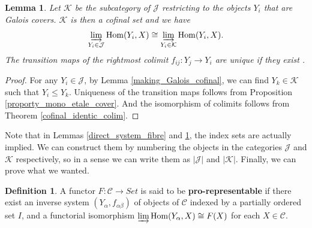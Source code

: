 \documentclass{article}
\theoremstyle{plain}
\newtheorem{lemma}[theorem]{Lemma}
\theoremstyle{definition}
\newtheorem{definition}[theorem]{Definition}
\DeclareMathOperator{\Hom}{Hom}
\begin{document}
\begin{lemma}
\label{inverse_system_Galois}
    Let $\mathcal{K}$ be the subcategory of $\mathcal{J}$ restricting to the objects $Y_i$ that are Galois covers. $\mathcal{K}$ is then a cofinal set and we have 
    $$\varinjlim_{Y_i\in\mathcal{J}}\Hom(Y_i,X) \cong \varinjlim_{Y_i\in \mathcal{K}} \Hom(Y_i,X).$$
    The transition maps of the rightmost colimit $f_{ij}: Y_j\rightarrow Y_i$ are unique if they exist .
\end{lemma}
\begin{proof}
    For any $Y_i\in \mathcal{J}$, by Lemma \ref{making_Galois_cofinal}, we can find $Y_k\in \mathcal{K}$ such that $Y_i\leq Y_k$. 
    Uniqueness of the transition maps follows from Proposition \ref{proporty_mono_etale_cover}. 
    And the isomorphism of colimits follows from Theorem \ref{cofinal_identic_colim}.
\end{proof}

\noindent Note that in Lemmas \ref{direct_system_fibre} and \ref{inverse_system_Galois}, the index sets are actually implied. 
We can construct them by numbering the objects in the categories $\mathcal{J}$ and $\mathcal{K}$ respectively, so in a sense we can write them as $|\mathcal{J}|$ and $|\mathcal{K}|$.
Finally, we can prove what we wanted.

\begin{definition}
    A functor $F: \mathcal{C} \rightarrow Set$ is said to be \textbf{pro-representable} if there exist an inverse system $(Y_\alpha, f_{\alpha\beta})$ of objects of $\mathcal{C}$ indexed by a partially ordered set $I$, and a functorial isomorphism $\varinjlim \Hom (Y_\alpha, X) \cong F(X)$ for each $X\in \mathcal{C}$.
\end{definition}
\end{document}
